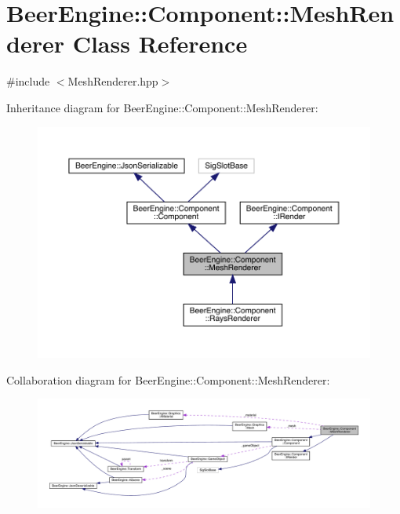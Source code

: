 \hypertarget{class_beer_engine_1_1_component_1_1_mesh_renderer}{}\section{Beer\+Engine\+:\+:Component\+:\+:Mesh\+Renderer Class Reference}
\label{class_beer_engine_1_1_component_1_1_mesh_renderer}


{\ttfamily \#include $<$Mesh\+Renderer.\+hpp$>$}



Inheritance diagram for Beer\+Engine\+:\+:Component\+:\+:Mesh\+Renderer\+:
\nopagebreak
\begin{figure}[H]
\begin{center}
\leavevmode
\includegraphics[width=350pt]{class_beer_engine_1_1_component_1_1_mesh_renderer__inherit__graph}
\end{center}
\end{figure}


Collaboration diagram for Beer\+Engine\+:\+:Component\+:\+:Mesh\+Renderer\+:
\nopagebreak
\begin{figure}[H]
\begin{center}
\leavevmode
\includegraphics[width=350pt]{class_beer_engine_1_1_component_1_1_mesh_renderer__coll__graph}
\end{center}
\end{figure}

